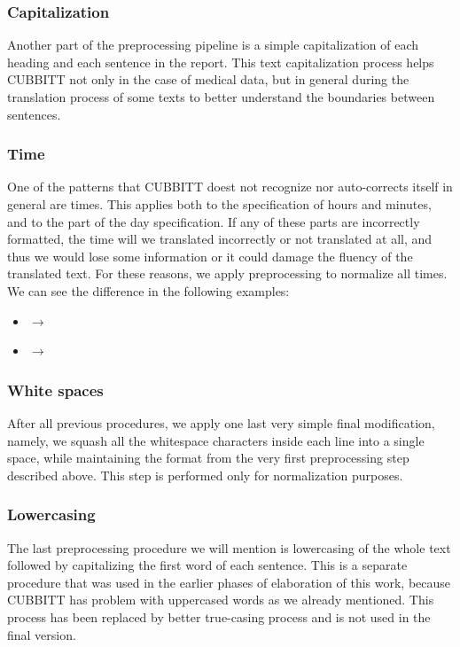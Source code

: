 \subsubsection*{Capitalization}
Another part of the preprocessing pipeline is a simple capitalization of each heading and each sentence in the report. This text capitalization process helps CUBBITT not only in the case of medical data, but in general during the translation process of some texts to better understand the boundaries between sentences.

\subsubsection*{Time}
One of the patterns that CUBBITT doest not recognize nor auto-corrects itself in general are times. This applies both to the specification of hours and minutes, and to the  part of the day specification. If any of these parts are incorrectly formatted, the time will we translated incorrectly or not translated at all, and thus we would lose some information or it could damage the fluency of the translated text. For these reasons, we apply preprocessing to normalize all times. We can see the difference in the following examples:
\begin{itemize}
	\item {} $\rightarrow$ 
	\item {} $\rightarrow$ 
\end{itemize}

\subsubsection*{White spaces}
After all previous procedures, we apply one last very simple final modification, namely, we squash all the whitespace characters inside each line into a single space, while maintaining the format from the very first preprocessing step described above. This step is performed only for normalization purposes.

\subsubsection*{Lowercasing}
The last preprocessing procedure we will mention is lowercasing of the whole text followed by capitalizing the first word of each sentence. This is a separate procedure that was used in the earlier phases of elaboration of this work, because CUBBITT has problem with uppercased words as we already mentioned. This process has been replaced by better true-casing process and is not used in the final version.















